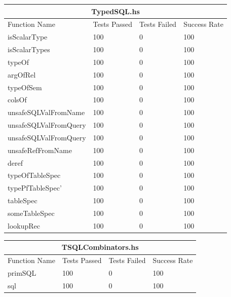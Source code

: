 \documentclass[12pt, svgnames]{article}
\begin{document}
\begin{adjustwidth}{-0.5cm}{}    
    \begin{tabular}[h!]{ |p{5cm}||p{3cm}|p{3cm}|p{3cm}|  }
        
        \hline
        \multicolumn{4}{|c|}{TypedSQL.hs} \\
        \hline
        Function Name & Tests Passed & Tests Failed & Success Rate\\
        \hline
        isScalarType   & 100    &0&   100\\
        isScalarTypes&   100  & 0   &100\\
        typeOf &100 & 0&  100\\
        argOfRel &100 & 0&  100\\
        typeOfSem&   100  & 0&100\\
        colsOf& 100  & 0   &100\\
        unsafeSQLValFromName& 100  & 0&100\\
        unsafeSQLValFromQuery& 100  & 0&100\\
        unsafeSQLValFromQuery& 100  & 0&100\\
        unsafeRefFromName& 100  & 0& 100\\
        deref& 100  & 0&100\\
        typeOfTableSpec& 100  & 0&100\\
        typePfTableSpec'& 100  & 0&100\\
        tableSpec& 100  & 0&100\\
        someTableSpec& 100  & 0&100\\
        lookupRec& 100  & 0&100\\
        \hline
    \end{tabular}
\end{adjustwidth}

\begin{adjustwidth}{-0.5cm}{}    
    \begin{tabular}[h!]{ |p{5cm}||p{3cm}|p{3cm}|p{3cm}|  }
        
        \hline
        \multicolumn{4}{|c|}{TSQLCombinators.hs} \\
        \hline
        Function Name & Tests Passed & Tests Failed & Success Rate\\
        \hline
        primSQL   & 100  & 0&   100\\
        sql       & 100  & 0&   100\\
        \hline
    \end{tabular}
\end{adjustwidth}
\end{document}
